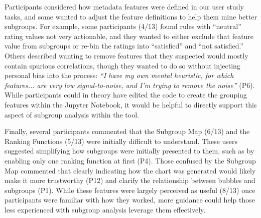 Participants considered how metadata features were defined in our user study tasks, and some wanted to adjust the feature definitions to help them mine better subgroups. 
For example, some participants (4/13) found rules with ``neutral'' rating values not very actionable, and they wanted to either exclude that feature value from subgroups or re-bin the ratings into ``satisfied'' and ``not satisfied.''
Others described wanting to remove features that they suspected would mostly contain spurious correlations, though they wanted to do so without injecting personal bias into the process: \textit{``I have my own mental heuristic, for which features... are very low signal-to-noise, and I'm trying to remove the noise''} (P6).
While participants could in theory have edited the code to create the grouping features within the Jupyter Notebook, it would be helpful to directly support this aspect of subgroup analysis within the tool.

Finally, several participants commented that the Subgroup Map (6/13) and the Ranking Functions (5/13) were initially difficult to understand.
These users suggested simplifying how subgroups were initially presented to them, such as by enabling only one ranking function at first (P4).
Those confused by the Subgroup Map commented that clearly indicating how the chart was generated would likely make it more trustworthy (P12) and clarify the relationship between bubbles and subgroups (P1).
While these features were largely perceived as useful (8/13) once participants were familiar with how they worked, more guidance could help those less experienced with subgroup analysis leverage them effectively.

